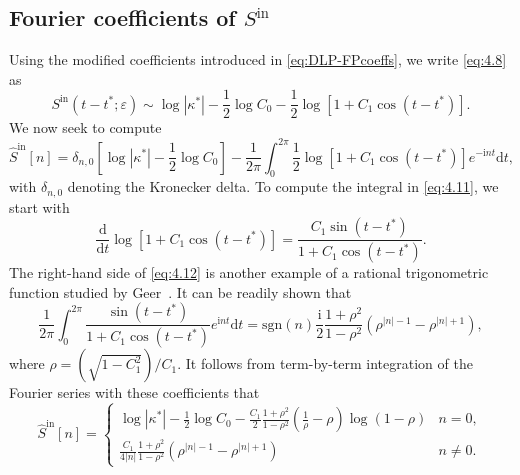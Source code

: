 \documentclass{article}[12pt]
\renewcommand{\epsilon}{\varepsilon}
\numberwithin{equation}{section}
\begin{document}
\subsection{Fourier coefficients of $S^{\text{in}}$}
Using the modified coefficients introduced in \eqref{eq:DLP-FPcoeffs},
we write \eqref{eq:4.8} as
\begin{equation}
  S^{\text{in}}(t - t^{\ast};\epsilon) \sim \log |\kappa^{\ast}| -
  \frac{1}{2} \log C_{0}  - \frac{1}{2} \log[ 1 + C_{1} \cos(t -
  t^{\ast}) ].
  \label{eq:4.10}
\end{equation}
We now seek to compute 
\begin{equation}
  \hat{S}^{\text{in}}[n] =  \delta_{n,0} \left[ \log |\kappa^{\ast}|
    - \frac{1}{2} \log C_{0} \right] - \frac{1}{2\pi} \int_{0}^{2\pi}
  \frac{1}{2} \log[ 1 + C_{1} \cos(t - t^{\ast}) ] e^{-\mathrm{i} n t}
  \mathrm{d}t,
  \label{eq:4.11}
\end{equation}
with $\delta_{n,0}$ denoting the Kronecker delta.  To compute the
integral in \eqref{eq:4.11}, we start with
\begin{equation}
  \frac{\mathrm{d}}{\mathrm{d}t} \log[ 1 +
  C_{1} \cos(t - t^{\ast}) ] = \frac{C_{1} \sin(t - t^{\ast})}{1 +
    C_{1} \cos(t - t^{\ast})}.
  \label{eq:4.12}
\end{equation}
The right-hand side of \eqref{eq:4.12} is another example of a
rational trigonometric function studied by
Geer~\cite{geer1995rational}. It can be readily shown that
\begin{equation}
  \frac{1}{2\pi} \int_{0}^{2\pi} \frac{\sin(t -
    t^{\ast})}{1 + C_{1} \cos(t - t^{\ast})} e^{\mathrm{i} n t}
  \mathrm{d}t = \text{sgn}(n) \frac{\mathrm{i}}{2} \frac{1 +
    \rho^{2}}{1 - \rho^{2}} \left( \rho^{|n| - 1} - \rho^{|n| + 1}
  \right),
\end{equation}
where $\rho = \left( \sqrt{1 - C_{1}^{2}} \right)/C_{1}$.  It follows
from term-by-term integration of the Fourier series with these
coefficients that
\begin{equation}
  \hat{S}^{\text{in}}[n] = \begin{cases}
    \displaystyle \log | \kappa^{\ast} | - \frac{1}{2} \log C_{0} -
    \frac{C_{1}}{2} \frac{1 + \rho^{2}}{1 - \rho^{2}} \left(
      \frac{1}{\rho} - \rho \right) \log( 1 - \rho) & n = 0,\\
    \displaystyle \frac{C_{1}}{4 |n|} \frac{1 +
      \rho^{2}}{1 - \rho^{2}} \left( \rho^{|n| - 1} - \rho^{|n| + 1}
    \right) & n \neq 0.
  \end{cases}
  \label{eq:4.14}
\end{equation}
\end{document}
